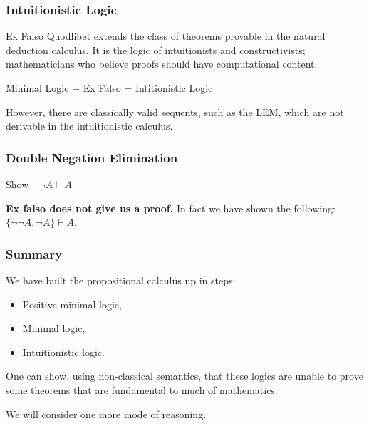 \documentclass{beamer}
\theoremstyle{indentDefn} \newtheorem{defn}[]{Definition}
\begin{document}
\begin{frame}
  \frametitle{Intuitionistic Logic}

	Ex Falso Quodlibet extends the class of theorems provable in the natural deduction calculus. It is the logic of intuitionists and constructivists; mathematicians who believe proofs should have computational content.
	
	\begin{center}
  		Minimal Logic + Ex Falso = Intitionistic Logic
	\end{center}

	However, there are classically valid sequents, such as the LEM, which are not derivable in the intuitionistic calculus. 

	\vspace{4cm}

\end{frame}

\begin{frame}
	\frametitle{Double Negation Elimination}
	
	Show $\lnot\lnot A \vdash A$ 
	\vspace{5cm}
	
	\pause
	
	{\bf Ex falso does not give us a proof.} In fact we have shown the following: $\{\lnot\lnot A, \lnot A\} \vdash A$.
	
\end{frame}



\begin{frame}
	\frametitle{Summary}

	We have built the propositional calculus up in steps: 

	\begin{itemize}
		\item Positive minimal logic, 
		\item Minimal logic, 
		\item Intuitionistic logic.
	\end{itemize}

	\vspace{0.5cm}

	One can show, using non-classical semantics, that these logics are unable to prove some theorems that are fundamental to much of mathematics. 

	\vspace{0.3cm}

	We will consider one more mode of reasoning. %

\end{frame}
\end{document}
